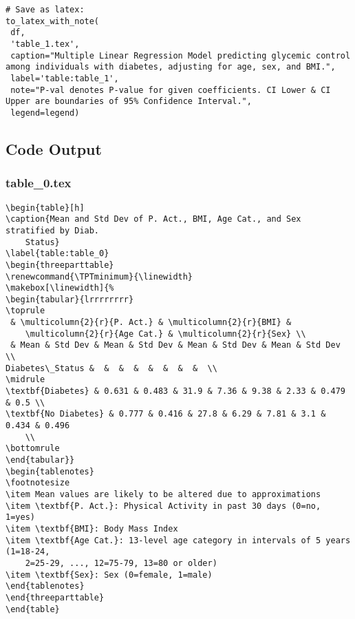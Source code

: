 \documentclass[11pt]{article}
\begin{document}
\begin{verbatim}
# Save as latex:
to_latex_with_note(
 df,
 'table_1.tex',
 caption="Multiple Linear Regression Model predicting glycemic control among individuals with diabetes, adjusting for age, sex, and BMI.", 
 label='table:table_1',
 note="P-val denotes P-value for given coefficients. CI Lower & CI Upper are boundaries of 95% Confidence Interval.", 
 legend=legend)

\end{verbatim}



\subsection{Code Output}

\subsubsection*{table\_0.tex}

\begin{Verbatim}[tabsize=4]
\begin{table}[h]
\caption{Mean and Std Dev of P. Act., BMI, Age Cat., and Sex stratified by Diab.
	Status}
\label{table:table_0}
\begin{threeparttable}
\renewcommand{\TPTminimum}{\linewidth}
\makebox[\linewidth]{%
\begin{tabular}{lrrrrrrrr}
\toprule
 & \multicolumn{2}{r}{P. Act.} & \multicolumn{2}{r}{BMI} &
	\multicolumn{2}{r}{Age Cat.} & \multicolumn{2}{r}{Sex} \\
 & Mean & Std Dev & Mean & Std Dev & Mean & Std Dev & Mean & Std Dev \\
Diabetes\_Status &  &  &  &  &  &  &  &  \\
\midrule
\textbf{Diabetes} & 0.631 & 0.483 & 31.9 & 7.36 & 9.38 & 2.33 & 0.479 & 0.5 \\
\textbf{No Diabetes} & 0.777 & 0.416 & 27.8 & 6.29 & 7.81 & 3.1 & 0.434 & 0.496
	\\
\bottomrule
\end{tabular}}
\begin{tablenotes}
\footnotesize
\item Mean values are likely to be altered due to approximations
\item \textbf{P. Act.}: Physical Activity in past 30 days (0=no, 1=yes)
\item \textbf{BMI}: Body Mass Index
\item \textbf{Age Cat.}: 13-level age category in intervals of 5 years (1=18-24,
	2=25-29, ..., 12=75-79, 13=80 or older)
\item \textbf{Sex}: Sex (0=female, 1=male)
\end{tablenotes}
\end{threeparttable}
\end{table}

\end{Verbatim}
\end{document}
